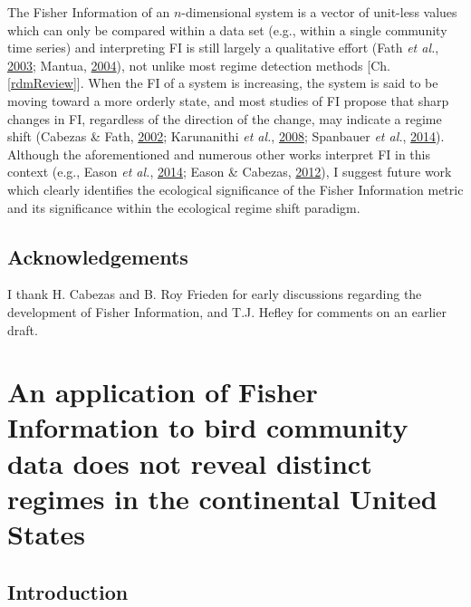 \documentclass[print]{nuthesis}
\begin{document}
The Fisher Information of an \(n\)-dimensional system is a vector of unit-less values which can only be compared within a data set (e.g., within a single community time series) and interpreting FI is still largely a qualitative effort (Fath \emph{et al.}, \protect\hyperlink{ref-fath_regime_2003}{2003}; Mantua, \protect\hyperlink{ref-mantua_methods_2004}{2004}), not unlike most regime detection methods {[}Ch. \ref{rdmReview}{]}. When the FI of a system is increasing, the system is said to be moving toward a more orderly state, and most studies of FI propose that sharp changes in FI, regardless of the direction of the change, may indicate a regime shift (Cabezas \& Fath, \protect\hyperlink{ref-cabezas_towards_2002}{2002}; Karunanithi \emph{et al.}, \protect\hyperlink{ref-karunanithi_detection_2008}{2008}; Spanbauer \emph{et al.}, \protect\hyperlink{ref-spanbauer_prolonged_2014}{2014}). Although the aforementioned and numerous other works interpret FI in this context (e.g., Eason \emph{et al.}, \protect\hyperlink{ref-eason2014managing}{2014}; Eason \& Cabezas, \protect\hyperlink{ref-eason_evaluating_2012}{2012}), I suggest future work which clearly identifies the ecological significance of the Fisher Information metric and its significance within the ecological regime shift paradigm.

\hypertarget{acknowledgements}{%
\section{Acknowledgements}\label{acknowledgements}}

I thank H. Cabezas and B. Roy Frieden for early discussions regarding the development of Fisher Information, and T.J. Hefley for comments on an earlier draft.

\hypertarget{fisherSpatial}{%
\chapter{An application of Fisher Information to bird community data does not reveal distinct regimes in the continental United States}\label{fisherSpatial}}

\hypertarget{introduction-2}{%
\section{Introduction}\label{introduction-2}}
\end{document}
